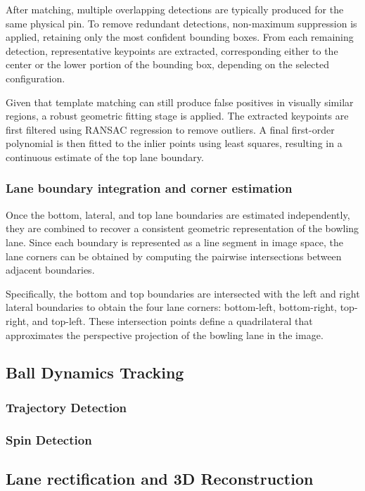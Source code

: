 After matching, multiple overlapping detections are typically produced for the same physical pin. To remove redundant detections, non-maximum suppression is applied, retaining only the most confident bounding boxes. From each remaining detection, representative keypoints are extracted, corresponding either to the center or the lower portion of the bounding box, depending on the selected configuration.

Given that template matching can still produce false positives in visually similar regions, a robust geometric fitting stage is applied. The extracted keypoints are first filtered using RANSAC regression to remove outliers. A final first-order polynomial is then fitted to the inlier points using least squares, resulting in a continuous estimate of the top lane boundary.

\subsubsection{Lane boundary integration and corner estimation}
Once the bottom, lateral, and top lane boundaries are estimated independently, they are combined to recover a consistent geometric representation of the bowling lane. Since each boundary is represented as a line segment in image space, the lane corners can be obtained by computing the pairwise intersections between adjacent boundaries.

Specifically, the bottom and top boundaries are intersected with the left and right lateral boundaries to obtain the four lane corners: bottom-left, bottom-right, top-right, and top-left. These intersection points define a quadrilateral that approximates the perspective projection of the bowling lane in the image.




\subsection{Ball Dynamics Tracking}

\subsubsection{Trajectory Detection}

\subsubsection{Spin Detection}

\subsection{Lane rectification and 3D Reconstruction}

